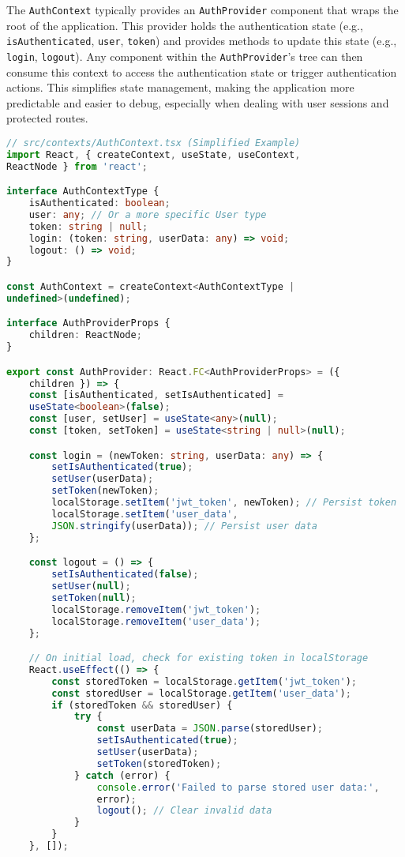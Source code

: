 \documentclass{report}
\begin{document}
The \texttt{AuthContext} typically provides an \texttt{AuthProvider} component that wraps the root of the application. This provider holds the authentication state (e.g., \texttt{isAuthenticated}, \texttt{user}, \texttt{token}) and provides methods to update this state (e.g., \texttt{login}, \texttt{logout}). Any component within the \texttt{AuthProvider}'s tree can then consume this context to access the authentication state or trigger authentication actions. This simplifies state management, making the application more predictable and easier to debug, especially when dealing with user sessions and protected routes.

\begin{lstlisting}[caption={Code Snippet 4.3: Simplified \texttt{AuthContext.tsx} demonstrating global authentication state management using React Context API.},label={lst:authcontext},language=TypeScript]
// src/contexts/AuthContext.tsx (Simplified Example)
import React, { createContext, useState, useContext,
ReactNode } from 'react';

interface AuthContextType {
    isAuthenticated: boolean;
    user: any; // Or a more specific User type
    token: string | null;
    login: (token: string, userData: any) => void;
    logout: () => void;
}

const AuthContext = createContext<AuthContextType |
undefined>(undefined);

interface AuthProviderProps {
    children: ReactNode;
}

export const AuthProvider: React.FC<AuthProviderProps> = ({
    children }) => {
    const [isAuthenticated, setIsAuthenticated] =
    useState<boolean>(false);
    const [user, setUser] = useState<any>(null);
    const [token, setToken] = useState<string | null>(null);

    const login = (newToken: string, userData: any) => {
        setIsAuthenticated(true);
        setUser(userData);
        setToken(newToken);
        localStorage.setItem('jwt_token', newToken); // Persist token
        localStorage.setItem('user_data',
        JSON.stringify(userData)); // Persist user data
    };

    const logout = () => {
        setIsAuthenticated(false);
        setUser(null);
        setToken(null);
        localStorage.removeItem('jwt_token');
        localStorage.removeItem('user_data');
    };

    // On initial load, check for existing token in localStorage
    React.useEffect(() => {
        const storedToken = localStorage.getItem('jwt_token');
        const storedUser = localStorage.getItem('user_data');
        if (storedToken && storedUser) {
            try {
                const userData = JSON.parse(storedUser);
                setIsAuthenticated(true);
                setUser(userData);
                setToken(storedToken);
            } catch (error) {
                console.error('Failed to parse stored user data:',
                error);
                logout(); // Clear invalid data
            }
        }
    }, []);


\end{lstlisting}
\end{document}
